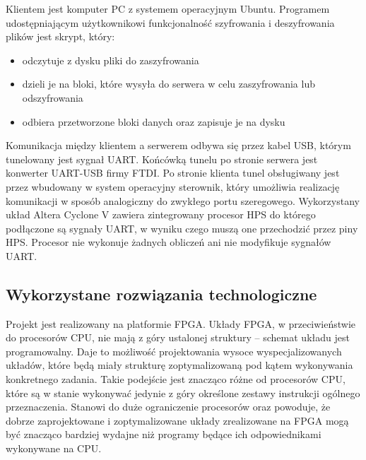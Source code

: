 Klientem jest komputer PC z systemem operacyjnym Ubuntu. Programem udostępniającym użytkownikowi funkcjonalność szyfrowania i deszyfrowania plików jest skrypt, który:
\begin{itemize}
\item odczytuje z dysku pliki do zaszyfrowania
\item dzieli je na bloki, które wysyła do serwera w celu zaszyfrowania lub odszyfrowania
\item odbiera przetworzone bloki danych oraz zapisuje je na dysku 
\end{itemize}

Komunikacja między klientem a serwerem odbywa się przez kabel USB, którym tunelowany jest sygnał UART. Końcówką tunelu po stronie serwera jest konwerter UART-USB firmy FTDI. Po stronie klienta tunel obsługiwany jest przez wbudowany w system operacyjny sterownik, który umożliwia realizację komunikacji w sposób analogiczny do zwykłego portu szeregowego. Wykorzystany układ Altera Cyclone V zawiera zintegrowany procesor HPS do którego podłączone są sygnały UART, w wyniku czego muszą one przechodzić przez piny HPS. Procesor nie wykonuje żadnych obliczeń ani nie modyfikuje sygnałów UART.

\subsection{Wykorzystane rozwiązania technologiczne}
Projekt jest realizowany na platformie FPGA. Układy FPGA, w przeciwieństwie do procesorów CPU, nie mają z góry ustalonej struktury -- schemat układu jest programowalny. Daje to możliwość projektowania wysoce wyspecjalizowanych układów, które będą miały strukturę zoptymalizowaną pod kątem wykonywania konkretnego zadania. Takie podejście jest znacząco różne od procesorów CPU, które są w stanie wykonywać jedynie z góry określone zestawy instrukcji ogólnego przeznaczenia. Stanowi do duże ograniczenie procesorów oraz powoduje, że dobrze zaprojektowane i zoptymalizowane układy zrealizowane na FPGA mogą być znacząco bardziej wydajne niż programy będące ich odpowiednikami wykonywane na CPU.

